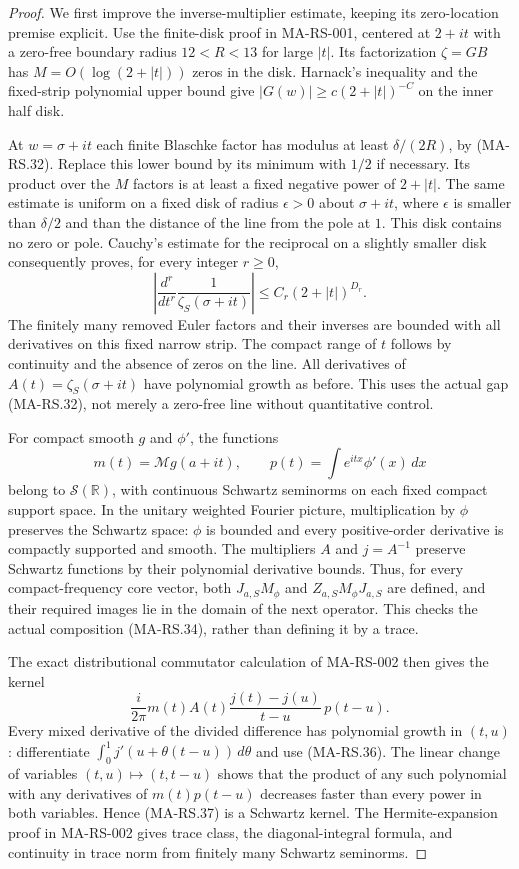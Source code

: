 \begin{proof}
We first improve the inverse-multiplier estimate, keeping its
zero-location premise explicit. Use the finite-disk proof in
MA-RS-001, centered at $2+it$ with a zero-free boundary radius
$12<R<13$ for large $|t|$. Its factorization $\zeta=G B$
has $M=O(\log(2+|t|))$ zeros in the disk. Harnack's inequality
and the fixed-strip polynomial upper bound give
$|G(w)|\ge c(2+|t|)^{-C}$ on the inner half disk.

At $w=\sigma+it$ each finite Blaschke factor has modulus at
least $\delta/(2R)$, by (MA-RS.32). Replace this lower bound
by its minimum with $1/2$ if necessary. Its product over the
$M$ factors is at least a fixed negative power of $2+|t|$.
The same estimate is uniform on a fixed disk of radius
$\epsilon>0$ about $\sigma+it$, where $\epsilon$ is smaller
than $\delta/2$ and than the distance of the line from the
pole at $1$. This disk contains no zero or pole.
Cauchy's estimate for the reciprocal on a slightly smaller
disk consequently proves, for every integer $r\ge0$,
\[
 \left|\frac{d^r}{dt^r}\frac1{\zeta_S(\sigma+it)}\right|
       \le C_r(2+|t|)^{D_r}.
 \tag{MA-RS.36}
\]
The finitely many removed Euler factors and their inverses
are bounded with all derivatives on this fixed narrow strip.
The compact range of $t$ follows by continuity and the absence
of zeros on the line. All derivatives of
$A(t)=\zeta_S(\sigma+it)$ have polynomial growth as before.
This uses the actual gap (MA-RS.32), not merely a zero-free
line without quantitative control.

For compact smooth $g$ and $\phi'$, the functions
\[
     m(t)=\mathcal Mg(a+it),\qquad
     p(t)=\int e^{itx}\phi'(x)\,dx
\]
belong to $\mathcal S(\mathbb R)$, with continuous Schwartz
seminorms on each fixed compact support space. In the unitary
weighted Fourier picture, multiplication by $\phi$ preserves
the Schwartz space: $\phi$ is bounded and every positive-order
derivative is compactly supported and smooth. The multipliers
$A$ and $j=A^{-1}$ preserve Schwartz functions by their
polynomial derivative bounds. Thus, for every compact-frequency
core vector, both $J_{a,S}M_\phi$ and
$Z_{a,S}M_\phi J_{a,S}$ are defined, and their required
images lie in the domain of the next operator. This checks
the actual composition (MA-RS.34), rather than defining
it by a trace.

The exact distributional commutator calculation of MA-RS-002
then gives the kernel
\[
       \frac{i}{2\pi}m(t)A(t)
                   \frac{j(t)-j(u)}{t-u}\,p(t-u).
 \tag{MA-RS.37}
\]
Every mixed derivative of the divided difference has polynomial
growth in $(t,u)$: differentiate
$\int_0^1j'(u+\theta(t-u))\,d\theta$ and use
(MA-RS.36). The linear change of variables $(t,u)\mapsto
(t,t-u)$ shows that the product of any such polynomial with
any derivatives of $m(t)p(t-u)$ decreases faster than every
power in both variables. Hence (MA-RS.37) is a Schwartz
kernel. The Hermite-expansion proof in MA-RS-002 gives trace
class, the diagonal-integral formula, and continuity in trace
norm from finitely many Schwartz seminorms.


\end{proof}
